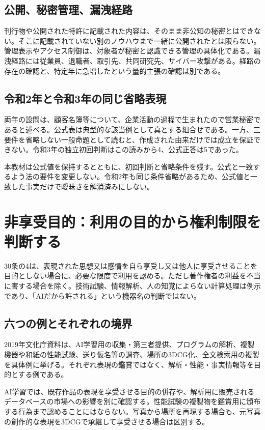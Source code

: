 \subsection{公開、秘密管理、漏洩経路}
\label{theory:ip:secrecy}
刊行物や公開された特許に記載された内容は、そのまま非公知の秘密とはできない。そこに記載されていない別のノウハウまで一緒に公開されたとは限らない。管理表示やアクセス制御は、対象者が秘密と認識できる管理の具体化である。漏洩経路には従業員、退職者、取引先、共同研究先、サイバー攻撃がある。経路の存在の確認と、特定年に急増したという量的主張の確認は別である。

\subsection{令和2年と令和3年の同じ省略表現}
\label{theory:ip:secret_ambiguity}
両年の設問は、顧客名簿等について、企業活動の過程で生まれたので営業秘密であると述べる。公式表は典型的な該当例として真とする組合せである。一方、三要件を省略しない一般命題として読むと、作成された由来だけでは成立を保証できない。令和3年の独立初回判断はこの読みから4、公式正答は5であった。

本教材は公式値を保持するとともに、初回判断と省略条件を残す。公式と一致するよう法の要件を変更しない。令和2年も同じ条件省略があるため、公式値と一致した事実だけで曖昧さを解消済みにしない。

\section{非享受目的：利用の目的から権利制限を判断する}
\label{theory:ip:nonenjoyment}
30条の4は、表現された思想又は感情を自ら享受し又は他人に享受させることを目的としない場合に、必要な限度で利用を認める。ただし著作権者の利益を不当に害する場合を除く。技術試験、情報解析、人の知覚によらない計算処理は例示であり、「AIだから許される」という機器名の判断ではない\parencite{ip_flexible2019,ip_copyright_statute}。

\subsection{六つの例とそれぞれの境界}
\label{theory:ip:six_cases}
2019年文化庁資料は、AI学習用の収集・第三者提供、プログラムの解析、複製機器や和紙の性能試験、送り仮名等の調査、場所の3DCG化、全文検索用の複製を具体例に挙げる\parencite{ip_flexible2019}。それぞれ表現の鑑賞ではなく、解析・性能・事実情報等を目的とする例である。

AI学習では、既存作品の表現を享受させる目的の併存や、解析用に販売されるデータベースの市場への影響を別に確認する。性能試験の複製物を鑑賞用に頒布する行為まで認めることにはならない。写真から場所を再現する場合も、元写真の創作的な表現を3DCGで承継して享受させる場合は区別する。

